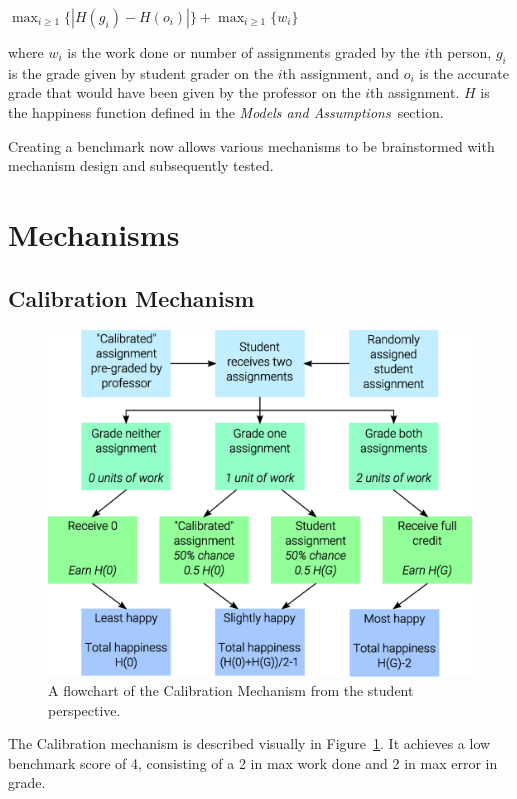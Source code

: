\documentclass{chi-ext}
\begin{document}
$\max_{i \ge 1} \{|H(g_i)-H(o_i)|\} + \max_{i \ge 1} \{w_i\}$

where $w_i$ is the work done or number of assignments graded by the $i$th person, $g_i$ is the grade given by student grader on the $i$th assignment, and $o_i$ is the accurate grade that would have been given by the professor on the $i$th assignment. $H$ is the happiness function defined in the \textit{Models and Assumptions}~section.

Creating a benchmark now allows various mechanisms to be brainstormed with mechanism design and subsequently tested.
\section{Mechanisms}
\subsection{Calibration Mechanism}

\begin{figure}
  \centering
  \includegraphics[width=\linewidth]{Calibration-Flowchart.eps}
  \caption{A flowchart of the Calibration Mechanism from the student perspective.}
  \label{fig:calibration}
\end{figure}

The Calibration mechanism is described visually in Figure~\ref{fig:calibration}. It achieves a low benchmark score of 4, consisting of a 2 in max work done and 2 in max error in grade.
\end{document}
